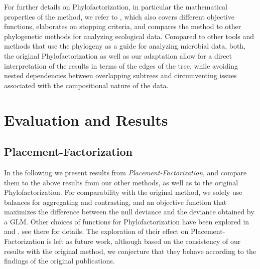 For further details on Phylofactorization, in particular the mathematical properties of the method,
we refer to \cite{Washburne2019},
which also covers different objective functions, elaborates on stopping criteria,
and compares the method to other phylogenetic methods for analyzing ecological data.
Compared to other tools and methods that use the phylogeny as a guide for analyzing microbial data,
both, the original Phylofactorization as well as our adaptation allow for a direct interpretation of the results
in terms of the edges of the tree, while avoiding nested dependencies between overlapping subtrees
and circumventing issues associated with the compositional nature of the data.


\section{Evaluation and Results}
\label{ch:Factorization:sec:Evaluation}


\subsection{Placement-Factorization}
\label{ch:Factorization:sec:Evaluation:sub:Phylofactor}

In the following we present results from \emph{Placement-Factorization}, %
and compare them to the above results from our other methods, as well as to the original Phylofactorization.
For comparability with the original method, we solely use balances for aggregating and contrasting,
and an objective function that maximizes the difference between the null deviance and the deviance obtained by a \acf{GLM}.
Other choices of functions for Phylofactorization have been explored in \cite{Washburne2017a} and \cite{Washburne2019},
see there for details.
The exploration of their effect on Placement-Factorization is left as future work,
although based on the consistency of our results with the original method,
we conjecture that they behave according to the findings of the original publications.

